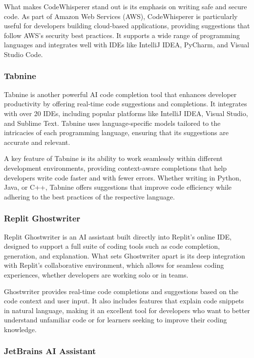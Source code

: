 What makes CodeWhisperer stand out is its emphasis on writing safe and secure code. As part of Amazon Web Services (AWS), CodeWhisperer is particularly useful for developers building cloud-based applications, providing suggestions that follow AWS's security best practices. It supports a wide range of programming languages and integrates well with IDEs like IntelliJ IDEA, PyCharm, and Visual Studio Code.

\subsubsection{Tabnine}

Tabnine \cite{Tabnine} is another powerful AI code completion tool that enhances developer productivity by offering real-time code suggestions and completions. It integrates with over 20 IDEs, including popular platforms like IntelliJ IDEA, Visual Studio, and Sublime Text. Tabnine uses language-specific models tailored to the intricacies of each programming language, ensuring that its suggestions are accurate and relevant.

A key feature of Tabnine is its ability to work seamlessly within different development environments, providing context-aware completions that help developers write code faster and with fewer errors. Whether writing in Python, Java, or C++, Tabnine offers suggestions that improve code efficiency while adhering to the best practices of the respective language.

\subsubsection{Replit Ghostwriter}

Replit Ghostwriter \cite{ReplitGhostwriter} is an AI assistant built directly into Replit's online IDE, designed to support a full suite of coding tools such as code completion, generation, and explanation. What sets Ghostwriter apart is its deep integration with Replit's collaborative environment, which allows for seamless coding experiences, whether developers are working solo or in teams.

Ghostwriter provides real-time code completions and suggestions based on the code context and user input. It also includes features that explain code snippets in natural language, making it an excellent tool for developers who want to better understand unfamiliar code or for learners seeking to improve their coding knowledge.

\subsubsection{JetBrains AI Assistant}

